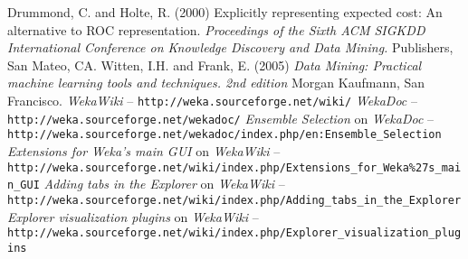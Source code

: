 \documentclass[a4paper]{article}
\begin{document}
\begin{thebibliography}{999}
    Drummond, C. and Holte, R. (2000) Explicitly representing expected cost: An alternative to ROC representation. \textit{Proceedings of the Sixth ACM SIGKDD International Conference on Knowledge Discovery and Data Mining.}
Publishers, San Mateo, CA.
	 Witten, I.H. and Frank, E. (2005) \textit{Data Mining: Practical machine
learning tools and techniques. 2nd edition}  Morgan Kaufmann, San
Francisco.
	 \textit{WekaWiki} -- \texttt{http://weka.sourceforge.net/wiki/}
	 \textit{WekaDoc} -- \texttt{http://weka.sourceforge.net/wekadoc/}
	 \textit{Ensemble Selection} on \textit{WekaDoc} -- \\ \small{\texttt{http://weka.sourceforge.net/wekadoc/index.php/en:Ensemble\_Selection}}
	 \textit{Extensions for Weka's main GUI} on \textit{WekaWiki} -- \\
\small{\texttt{http://weka.sourceforge.net/wiki/index.php/Extensions\_for\_Weka\%27s\_main\_GUI}}
	 \textit{Adding tabs in the Explorer} on \textit{WekaWiki} -- \\
\small{\texttt{http://weka.sourceforge.net/wiki/index.php/Adding\_tabs\_in\_the\_Explorer}}
	 \textit{Explorer visualization plugins} on \textit{WekaWiki} -- \\
\small{\texttt{http://weka.sourceforge.net/wiki/index.php/Explorer\_visualization\_plugins}}
\end{thebibliography}
\end{document}
